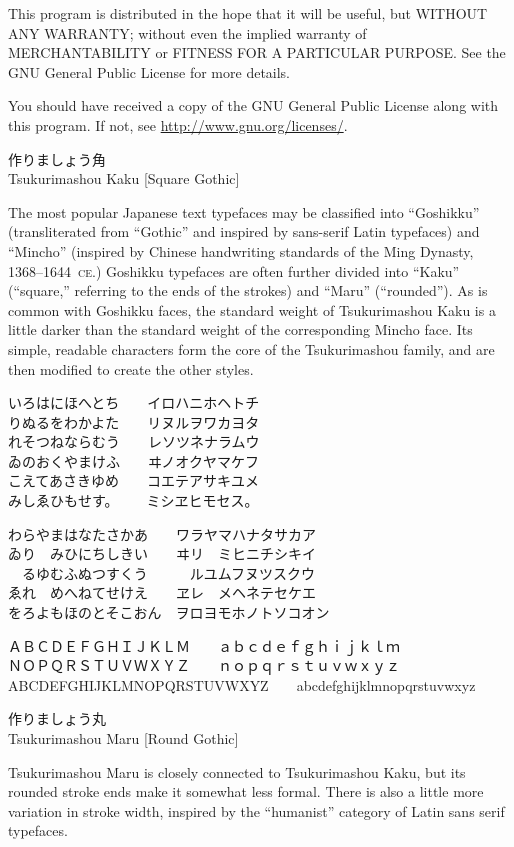 \documentclass[14pt]{extarticle}
\newcommand{\iroha}{%
いろはにほへとち~~~~イロハニホヘトチ\\
りぬるをわかよた~~~~リヌルヲワカヨタ\\
れそつねならむう~~~~レソツネナラムウ\\
ゐのおくやまけふ~~~~ヰノオクヤマケフ\\
こえてあさきゆめ~~~~コエテアサキユメ\\
みしゑひもせす。~~~~ミシヱヒモセス。\par
}
\newcommand{\gojuuonzu}{%
わらやまはなたさかあ~~~~ワラヤマハナタサカア\\
ゐり~~みひにちしきい~~~~ヰリ~~ミヒニチシキイ\\
~~るゆむふぬつすくう~~~~~~ルユムフヌツスクウ\\
ゑれ~~めへねてせけえ~~~~ヱレ~~メヘネテセケエ\\
をろよもほのとそこおん~~ヲロヨモホノトソコオン\par
}
\begin{document}
This program is distributed in the hope that it will be useful,
but WITHOUT ANY WARRANTY; without even the implied warranty of
MERCHANTABILITY or FITNESS FOR A PARTICULAR PURPOSE.  See the
GNU General Public License for more details.

You should have received a copy of the GNU General Public License
along with this program.  If not, see \url{http://www.gnu.org/licenses/}.

\clearpage


\kaku

\Large
作りましょう角\\
Tsukurimashou Kaku [Square Gothic]

\normalsize

The most popular Japanese text typefaces may be classified into ``Goshikku''
(transliterated from ``Gothic'' and inspired by sans-serif Latin typefaces)
and ``Mincho'' (inspired by Chinese handwriting standards of the Ming
Dynasty, 1368--1644~\textsc{ce}.) Goshikku typefaces are often further
divided into ``Kaku'' (``square,'' referring to the ends of the strokes) and
``Maru'' (``rounded'').  As is common with Goshikku faces, the standard
weight of Tsukurimashou Kaku is a little darker than the standard weight of
the corresponding Mincho face.  Its simple, readable characters form the
core of the Tsukurimashou family, and are then modified to create the other
styles.

\kakumono
\iroha
\gojuuonzu

ＡＢＣＤＥＦＧＨＩＪＫＬＭ~~~~ａｂｃｄｅｆｇｈｉｊｋｌｍ\\
ＮＯＰＱＲＳＴＵＶＷＸＹＺ~~~~ｎｏｐｑｒｓｔｕｖｗｘｙｚ\\
ABCDEFGHIJKLMNOPQRSTUVWXYZ~~~~abcdefghijklmnopqrstuvwxyz

\clearpage


\maru

\Large
作りましょう丸\\
Tsukurimashou Maru [Round Gothic]

\normalsize

Tsukurimashou Maru is closely connected to Tsukurimashou Kaku, but its
rounded stroke ends make it somewhat less formal. 
There is also a little more variation in stroke width, inspired by the
``humanist'' category of Latin sans serif typefaces.
\end{document}
